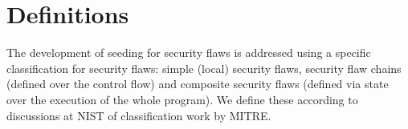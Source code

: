 \section{Definitions}

         The development of seeding for security flaws is addressed using a specific 
         classification for security flaws: simple (local) security flaws, 
         security flaw chains (defined over the control flow) and composite security flaws
         (defined via state over the execution of the whole program).
         We define these according to discussions at NIST of classification work by MITRE.
